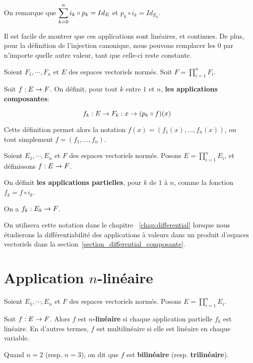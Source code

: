 On remarque que $\displaystyle \sum_{k = 0}^{n} i_{k} \circ p_{k} = Id_{E}$ et $p_{k} \circ
i_{k} = Id_{E_{k}}$.

Il est facile de montrer que ces applications sont linéaires, et continues.
De plus, pour la définition de l'injection canonique, nous pouvons remplacer les
$0$ par n'importe quelle autre valeur, tant que celle-ci reste constante.

\begin{definition} 
	\label{composante_function}
	Soient $F_{1}, \cdots, F_{n}$ et $E$ des espaces vectoriels normés.
	Soit $F = \displaystyle \prod_{i = 1}^{n} F_{i}$.

	Soit $f : E \rightarrow F$. On définit, pour tout $k$ entre $1$ et $n$,
	\textbf{les applications composantes}:

	\begin{equation*}
		f_{k} : E \rightarrow F_{k} : x \rightarrow (p_{k} \circ f) (x)
	\end{equation*}
\end{definition}

Cette définition permet alors la notation $f(x) = (f_{1}(x), \ldots, f_{n}(x))$,
ou tout simplement $f = (f_{1}, \ldots, f_{n})$.

\begin{definition} 
	\label{partial_application}
	Soient $E_{1}, \cdots, E_{n}$ et $F$ des espaces vectoriels normés.
	Posons $E = \displaystyle \prod_{i = 1}^{n} E_{i}$, et définissons
	$f : E \rightarrow F$.

	On définit \textbf{les applications partielles}, pour $k$ de $1$ à
	$n$, comme la fonction $f_{k} = f \circ i_{k}$.

	On a $f_{k} : E_{k} \rightarrow F$.
\end{definition}

On utilisera cette notation dans le chapitre ~\ref{chap:differential} lorsque nous
étudierons la différentiabilité des applications à valeurs dans un produit
d'espaces vectoriels dans la section~\ref{section_differential_composante}.

\section{Application $n$-linéaire}

\begin{definition}
	Soient $E_{1}, \cdots, E_{n}$ et $F$ des espaces vectoriels normés. Posons
	$E = \displaystyle \prod_{i = 1}^{n} E_{i}$.

	Soit $f : E \rightarrow F$. Alors $f$ est \textbf{$n$-linéaire} si chaque
	application partielle $f_{k}$ est linéaire. En d'autres termes, $f$ est
	multilinéaire si elle est linéaire en chaque variable.

	Quand $n = 2$ (resp. $n = 3$), on dit que $f$ est \textbf{bilinéaire} (resp.
	\textbf{trilinéaire}).
\end{definition}

